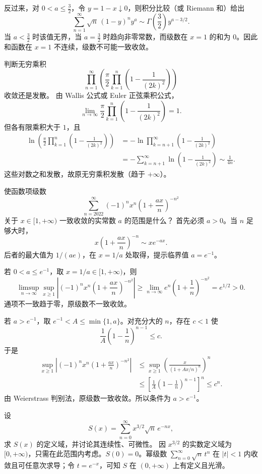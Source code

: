 反过来，对 $0<a\leq\frac32$，令 $y=1-x\downarrow0$，则积分比较（或 Riemann 和）给出
\[
\sum_{n=1}^{\infty}\sqrt n\,(1-y)^n y^a
\sim \Gamma\!\left(\frac32\right)y^{a-3/2}.
\]
当 $a<\frac32$ 时该值无界，当 $a=\frac32$ 时趋向非零常数，而级数在 $x=1$ 的和为 $0$。因此和函数在 $x=1$ 不连续，级数不可能一致收敛。

判断无穷乘积
\[
\prod_{n=1}^{\infty}
\left(\frac\pi2\prod_{k=1}^{n}
\left(1-\frac1{(2k)^2}\right)\right)
\]
收敛还是发散。
\sol 由 Wallis 公式或 Euler 正弦乘积公式，
\[
\lim_{n\to\infty}\frac\pi2\prod_{k=1}^{n}
\left(1-\frac1{(2k)^2}\right)=1.
\]
但各有限乘积大于 $1$，且
\[
\begin{aligned}
\ln\!\left(\frac\pi2\prod_{k=1}^{n}
\left(1-\frac1{(2k)^2}\right)\right)
&=-\ln\prod_{k=n+1}^{\infty}\left(1-\frac1{(2k)^2}\right)\\
&=-\sum_{k=n+1}^{\infty}\ln\left(1-\frac1{(2k)^2}\right)
\sim\frac1{4n}.
\end{aligned}
\]
这些对数之和发散，故原无穷乘积发散（趋于 $+\infty$）。

使函数项级数
\[
\sum_{n=2022}^{\infty}(-1)^n x^n
\left(1+\frac{ax}{n}\right)^{-n^2}
\]
关于 $x\in[1,+\infty)$ 一致收敛的实常数 $a$ 的范围是什么？
\sol 首先必须 $a>0$。当 $n$ 足够大时，
\[
x\left(1+\frac{ax}{n}\right)^{-n}\sim xe^{-ax}.
\]
后者的最大值为 $1/(ae)$，在 $x=1/a$ 处取得，提示临界值 $a=e^{-1}$。

若 $0<a\leq e^{-1}$，取 $x=1/a\in[1,+\infty)$，则
\[
\limsup_{n\to\infty}\sup_{x\geq1}
\left|(-1)^nx^n\left(1+\frac{ax}{n}\right)^{-n^2}\right|
\geq\lim_{n\to\infty}e^n\left(1+\frac1n\right)^{-n^2}
=e^{1/2}>0.
\]
通项不一致趋于零，原级数不一致收敛。

若 $a>e^{-1}$，取 $e^{-1}<A\leq\min\{1,a\}$。对充分大的 $n$，存在 $c<1$ 使
\[
\frac1A\left(1-\frac1n\right)^{n-1}\leq c.
\]
于是
\[
\begin{aligned}
\sup_{x\geq1}\left|(-1)^nx^n
\left(1+\frac{ax}{n}\right)^{-n^2}\right|
&\leq\sup_{x\geq1}
\left(\frac{x}{(1+Ax/n)^n}\right)^n\\
&\leq\left[\frac1A
\left(1-\frac1n\right)^{n-1}\right]^n
\leq c^n.
\end{aligned}
\]
由 Weierstrass 判别法，原级数一致收敛。所以条件为 $a>e^{-1}$。

设
\[
S(x)=\sum_{n=0}^{\infty}x^{3/2}\sqrt n\,e^{-nx},
\]
求 $S(x)$ 的定义域，并讨论其连续性、可微性。
\sol 因 $x^{3/2}$ 的实数定义域为 $[0,+\infty)$，只需在此范围内考虑。$S(0)=0$。幂级数 $\sum_{n=0}^{\infty}\sqrt n\,t^n$ 在 $|t|<1$ 内收敛且可任意次求导；令 $t=e^{-x}$，可知 $S$ 在 $(0,+\infty)$ 上有定义且光滑。

